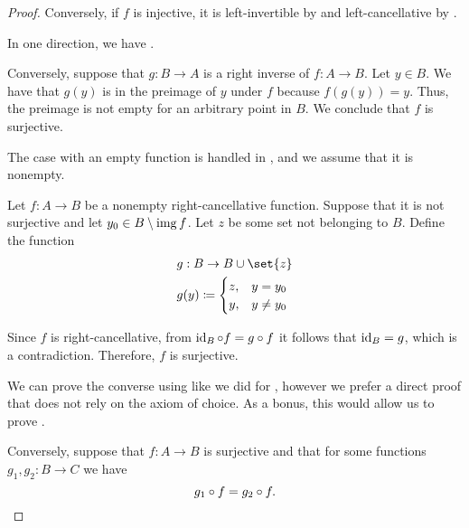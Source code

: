 \begin{proof}
  Conversely, if \( f \) is injective, it is left-invertible by  and left-cancellative by .

   In one direction, we have .

  Conversely, suppose that \( g: B \to A \) is a right inverse of \( f: A \to B \). Let \( y \in B \). We have that \( g(y) \) is in the preimage of \( y \) under \( f \) because \( f(g(y)) = y \). Thus, the preimage is not empty for an arbitrary point in \( B \). We conclude that \( f \) is surjective.

   The case with an empty function is handled in , and we assume that it is nonempty.

  Let \( f: A \to B \) be a nonempty right-cancellative function. Suppose that it is not surjective and let \( y_0 \in B \setminus \operatorname{img} f \). Let \( z \) be some set not belonging to \( B \). Define the function
  \begin{equation*}
    \begin{aligned}
      &g: B \to B \cup \set{ z } \\
      &g(y) \coloneqq \begin{cases}
        z, &y = y_0 \\
        y, &y \neq y_0
      \end{cases}
    \end{aligned}
  \end{equation*}

  Since \( f \) is right-cancellative, from \( \id_B \bincirc f = g \bincirc f \) it follows that \( \operatorname{id}_B = g \), which is a contradiction. Therefore, \( f \) is surjective.

  We can prove the converse using  like we did for , however we prefer a direct proof that does not rely on the axiom of choice. As a bonus, this would allow us to prove .

  Conversely, suppose that \( f: A \to B \) is surjective and that for some functions \( g_1, g_2: B \to C \) we have
  \begin{equation*}
    g_1 \bincirc f = g_2 \bincirc f.
  \end{equation*}


\end{proof}
